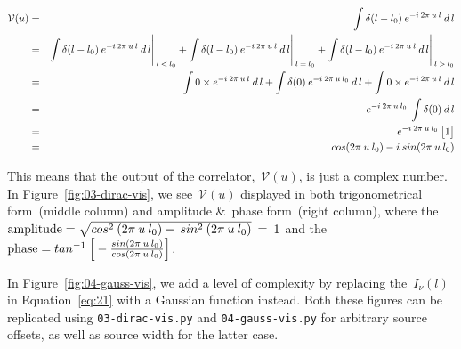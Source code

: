 \documentclass[11pt, a4paper]{article}
\newcommand{\msp}{\mkern \medmuskip}
\begin{document}
\begin{eqnarray}
  \label{eq:25}
  \mathcal{V}(u) &=& \int \delta(l - l_0) \msp e^{-i \msp 2\pi \msp u \msp l} \msp d\,l \nonumber \\
                 &=& \int \delta(l - l_0) \msp e^{-i \msp 2\pi \msp u \msp l} \msp d\,l \Bigg \rvert_{\msp l \msp < \msp l_0} + \int \delta(l - l_0) \msp e^{-i \msp 2\pi \msp u \msp l} \msp d\,l \Bigg \rvert_{\msp l \msp = \msp l_0} + \int \delta(l - l_0) \msp e^{-i \msp 2\pi \msp u \msp l} \msp d\,l \Bigg \rvert_{\msp l \msp > \msp l_0} \nonumber \\
                                   &=& \int 0 \times e^{-i \msp 2\pi \msp u \msp l} \msp d\,l + \int \delta(0) \msp e^{-i \msp 2\pi \msp u \msp l_0} \msp d\,l + \int 0 \times e^{-i \msp 2\pi \msp u \msp l} \msp d\,l \nonumber \\
                                   &=& e^{-i \msp 2\pi \msp u \msp l_0} \msp \int \delta(0) \msp d\,l \nonumber \\
                                   &=& e^{-i \msp 2\pi \msp u \msp l_0} \msp \big [1\big ] \nonumber \\
                                   &=& cos(2\pi \msp u \msp l_0) - i \msp sin(2\pi \msp u \msp l_0) \nonumber
\end{eqnarray}

This means that the output of the correlator,~$\mathcal{V}(u)$, is just a complex number. In Figure~\ref{fig:03-dirac-vis}, we see~$\mathcal{V}(u)$ displayed in both trigonometrical form~(middle column) and amplitude \&~phase form~(right column), where the~$\mbox{amplitude} = \sqrt{cos^2 \msp (2\pi \msp u \msp l_0) - \msp sin^2 \msp (2\pi \msp u \msp l_0)} \msp = \msp 1$ and the~$\mbox{phase} = tan^{-1} \msp \Big [-\frac{sin(2\pi \msp u \msp l_0)}{cos(2\pi \msp u \msp l_0)} \Big ]$.

In Figure~\ref{fig:04-gauss-vis}, we add a level of complexity by replacing the~$I_\nu (l)$ in Equation~\eqref{eq:21} with a Gaussian function instead. Both these figures can be replicated using \texttt{03-dirac-vis.py} and \texttt{04-gauss-vis.py} for arbitrary source offsets, as well as source width for the latter case.
\end{document}
